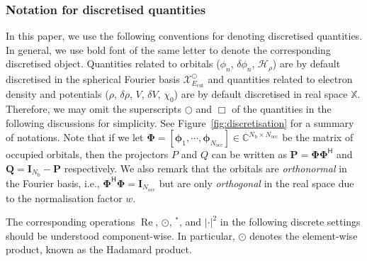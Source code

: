 \documentclass[hidelinks,onefignum,onetabnum]{siamart250211}
\newcommand{\C}{\mathbb{C}}
\newcommand{\Real}{\operatorname{Re}}
\newcommand{\Nocc}{N_{\mathrm{occ}}}
\newcommand{\Ecut}{E_{\mathrm{cut}}}
\newcommand{\X}{\mathbb{X}}
\newcommand{\Nb}{N_{\mathrm{b}}}
\newcommand{\Hrho}{\mathcal{H}_\rho}
\begin{document}
\subsubsection{Notation for discretised quantities}
In this paper, we use the following conventions for denoting discretised quantities. 
In general, we use bold font of the same letter to denote the corresponding discretised object. 
Quantities related to orbitals ($\phi_n$, $\delta \phi_n$, $\Hrho$) are 
by default discretised in the spherical Fourier basis $\mathcal{X}_{\Ecut}^{\bigcirc}$ 
and quantities related to electron density and 
potentials ($\rho$, $\delta \rho$, $V$, $\delta V$, $\chi_0$) are by default 
discretised in real space $\X$. 
Therefore, we may omit the superscripts $\bigcirc$ and $\Box$ of the quantities 
in the following discussions for simplicity. 
See Figure~\ref{fig:discretisation} for a summary of notations. 
Note that if we let 
$\bm \Phi = \left[ \bm \phi_1, \cdots, \bm \phi_{\Nocc} \right] \in \C^{\Nb \times \Nocc}$ 
be the matrix of occupied orbitals, then the projectors $P$ and $Q$ can 
be written as $\bm P = \bm \Phi \bm \Phi^\mathsf{H}$ and $\bm Q = \bm I_{\Nb} - \bm P$
respectively. We also remark that the orbitals are \emph{orthonormal} 
in the Fourier basis, i.e., $\bm \Phi^\mathsf{H} \bm \Phi = \bm I_{\Nocc}$ but 
are only \emph{orthogonal} in the real space due to the normalisation factor $w$.

The corresponding operations $\Real$, $\odot$, $^*$, and $|\cdot|^2$ in
the following discrete settings should be understood component-wise. In particular,
$\odot$ denotes the element-wise product, known as the Hadamard product.
\end{document}

